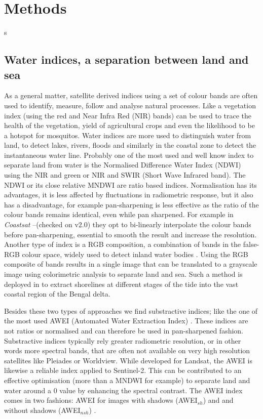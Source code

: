 \documentclass[remotesensing,article,submit,pdftex,moreauthors]{Definitions/mdpi}
\begin{document}
\section{Methods}
s\subsection{Water indices, a separation between land and sea}
As a general matter, satellite derived indices using a set of colour bands are often used to identify, measure, follow and analyse natural processes. Like a vegetation index (using the red and Near Infra Red (NIR) bands) can be used to trace the health of the vegetation, yield of agricultural crops and even the likelihood to be a hotspot for mosquitos. Water indices are more used to distinguish water from land, to detect lakes, rivers, floods and similarly in the coastal zone to detect the instantaneous water line. Probably one of the most used and well know index to separate land from water is the Normalised Difference Water Index (NDWI) using the NIR and green or NIR and SWIR (Short Wave Infrared band). The NDWI or its close relative MNDWI are ratio based indices. Normalisation has its advantages, it is less affected by fluctuations in radiometric response, but it also has a disadvantage, for example pan-sharpening is less effective as the ratio of the colour bands remains identical, even while pan sharpened. For example in \textit{Coastsat} --(checked on v2.0) they opt to bi-linearly interpolate the colour bands before pan-sharpening, essential to smooth the result and increase the resolution. Another type of index is a RGB composition, a combination of bands in the false-RGB colour space, widely used to detect inland water bodies \citep{PEKEL2014704}. Using the RGB composite of bands results in a single image that can be translated to a grayscale image using colorimetric analysis to separate land and sea. Such a method is deployed in \citet{Khan2019} to extract shorelines at different stages of the tide into the vast coastal region of the Bengal delta. 

Besides these two types of approaches we find substractive indices; like the one of the most used AWEI (Automated Water Extraction Index) \citep{FEYISA201423}. These indices are not ratios or normalised and can therefore be used in pan-sharpened fashion. Substractive indices typically rely greater radiometric resolution, or in other words more spectral bands, that are often not available on very high resolution satellites like Pleiades or Worldview. While developed for Landsat, the AWEI is likewise a reliable index applied to Sentinel-2. This can be contributed to an effective optimisation (more than a MNDWI for example) to separate land and water around a 0 value by enhancing the spectral contrast. The AWEI index comes in two fashions: AWEI for images with shadows (AWEI$_{sh}$) and and without shadows (AWEI$_{nsh}$) \citep{FEYISA201423}.
\end{document}
